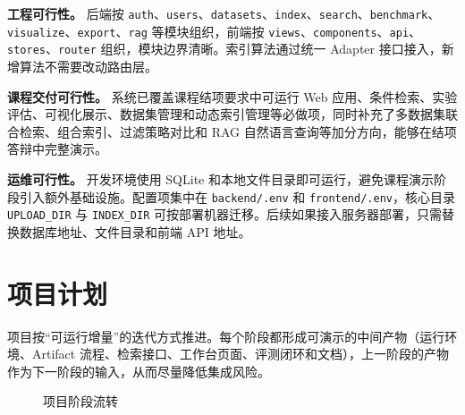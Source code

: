 \documentclass[UTF8,a4paper,12pt]{ctexrep}
\begin{document}
\textbf{工程可行性。} 后端按 \texttt{auth}、\texttt{users}、\texttt{datasets}、\texttt{index}、\texttt{search}、\texttt{benchmark}、\texttt{visualize}、\texttt{export}、\texttt{rag} 等模块组织，前端按 \texttt{views}、\texttt{components}、\texttt{api}、\texttt{stores}、\texttt{router} 组织，模块边界清晰。索引算法通过统一 Adapter 接口接入，新增算法不需要改动路由层。

\textbf{课程交付可行性。} 系统已覆盖课程结项要求中可运行 Web 应用、条件检索、实验评估、可视化展示、数据集管理和动态索引管理等必做项，同时补充了多数据集联合检索、组合索引、过滤策略对比和 RAG 自然语言查询等加分方向，能够在结项答辩中完整演示。

\textbf{运维可行性。} 开发环境使用 SQLite 和本地文件目录即可运行，避免课程演示阶段引入额外基础设施。配置项集中在 \texttt{backend/.env} 和 \texttt{frontend/.env}，核心目录 \texttt{UPLOAD\_DIR} 与 \texttt{INDEX\_DIR} 可按部署机器迁移。后续如果接入服务器部署，只需替换数据库地址、文件目录和前端 API 地址。

\section{项目计划}

项目按``可运行增量''的迭代方式推进。每个阶段都形成可演示的中间产物（运行环境、Artifact 流程、检索接口、工作台页面、评测闭环和文档），上一阶段的产物作为下一阶段的输入，从而尽量降低集成风险。

\begin{figure}[H]
  \centering
  \caption{项目阶段流转}
\end{figure}
\end{document}
